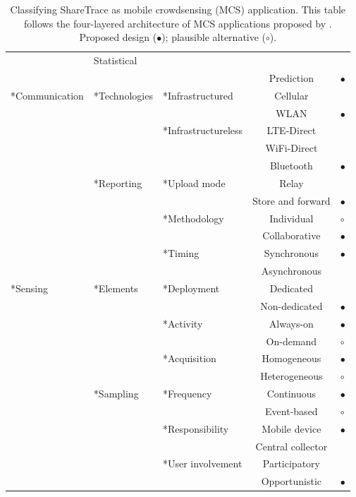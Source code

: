 \begin{table}[htbp]
\begin{tabularx}{\textwidth}{
    >{\centering\arraybackslash}X
    >{\centering\arraybackslash}X
    >{\centering\arraybackslash}X
    c
    >{\centering\arraybackslash}X}
			& Statistical & \\
			&&& Prediction & $\bullet$ \\
		\cmidrule{2-5}
\cmidrule{1-5}
\multirow{11}*{Communication}
	& \multirow{5}*{Technologies}
		& \multirow{2}*{Infrastructured}
			& Cellular & \\
			&&& WLAN & $\bullet$ \\
		\cmidrule{3-5}
		&& \multirow{3}*{Infrastructureless}
			& LTE-Direct & \\
			&&& WiFi-Direct & \\
			&&& Bluetooth & $\bullet$ \\
		\cmidrule{3-5}
	\cmidrule{2-5}
	& \multirow{6}*{Reporting}
		& \multirow{2}*{Upload mode}
			& Relay & \\
			&&& Store and forward & $\bullet$ \\
		\cmidrule{3-5}
		&& \multirow{2}*{Methodology}
			& Individual & $\circ$ \\
			&&& Collaborative & $\bullet$ \\
		\cmidrule{3-5}
		&& \multirow{2}*{Timing}
			& Synchronous & $\bullet$ \\
			&&& Asynchronous & \\
		\cmidrule{2-5}
\cmidrule{1-5}
\multirow{12}*{Sensing}
	& \multirow{6}*{Elements}
		& \multirow{2}*{Deployment}
			& Dedicated & \\
			&&& Non-dedicated & $\bullet$ \\
		\cmidrule{3-5}
		&& \multirow{2}*{Activity}
			& Always-on & $\bullet$ \\
			&&& On-demand & $\circ$ \\
		\cmidrule{3-5}
		&& \multirow{2}*{Acquisition}
			& Homogeneous & $\bullet$ \\
			&&& Heterogeneous & $\circ$ \\
	\cmidrule{2-5}
	& \multirow{6}*{Sampling}
		& \multirow{2}*{Frequency}
			& Continuous & $\bullet$ \\
			&&& Event-based & $\circ$ \\
		\cmidrule{3-5}
		&& \multirow{2}*{Responsibility}
			& Mobile device & $\bullet$ \\
			&&& Central collector & \\
		\cmidrule{3-5}
        && \multirow{2}*{User involvement}
			& Participatory & \\
			&&& Opportunistic & $\bullet$ \\
\bottomrule
\end{tabularx}
\caption[Classifying ShareTrace as mobile crowdsensing]{Classifying ShareTrace as mobile crowdsensing (MCS) application. This table follows the four-layered architecture of MCS applications proposed by \citet{Capponi2019}. Proposed design ($\bullet$); plausible alternative ($\circ$).}
\label{tab:classification}
\end{table}